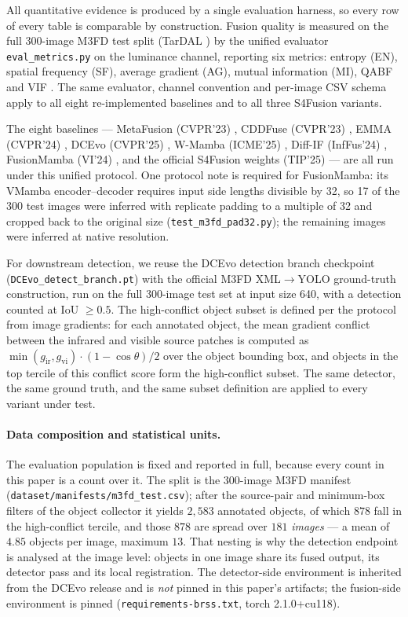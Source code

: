 \documentclass[pdflatex,sn-mathphys-num]{sn-jnl}
\theoremstyle{thmstyleone}%
\theoremstyle{thmstyletwo}%
\theoremstyle{thmstylethree}%
\begin{document}
All quantitative evidence is produced by a single evaluation harness, so every row of every table is comparable by construction. Fusion quality is measured on the full 300-image M3FD test split (TarDAL \cite{liu2022tardal}) by the unified evaluator \texttt{eval\_metrics.py} on the luminance channel, reporting six metrics: entropy (EN), spatial frequency (SF), average gradient (AG), mutual information (MI), QABF \cite{xydeas2000objective} and VIF \cite{sheikh2006image}. The same evaluator, channel convention and per-image CSV schema apply to all eight re-implemented baselines and to all three S4Fusion variants.

The eight baselines --- MetaFusion (CVPR'23) \cite{zhao2023metafusion}, CDDFuse (CVPR'23) \cite{zhao2023cddfuse}, EMMA (CVPR'24) \cite{zhao2024equivariant}, DCEvo (CVPR'25) \cite{liu2025dcevo}, W-Mamba (ICME'25) \cite{zhang2025wmamba}, Diff-IF (InfFus'24) \cite{yi2024diffif}, FusionMamba (VI'24) \cite{xie2024fusionmamba}, and the official S4Fusion weights (TIP'25) \cite{ma2025s4fusion} --- are all run under this unified protocol. One protocol note is required for FusionMamba: its VMamba \cite{liu2024vmamba} encoder--decoder requires input side lengths divisible by 32, so 17 of the 300 test images were inferred with replicate padding to a multiple of 32 and cropped back to the original size (\texttt{test\_m3fd\_pad32.py}); the remaining images were inferred at native resolution.

For downstream detection, we reuse the DCEvo detection branch checkpoint (\texttt{DCEvo\_detect\_branch.pt}) with the official M3FD XML$\to$YOLO ground-truth construction, run on the full 300-image test set at input size 640, with a detection counted at IoU $\geq 0.5$. The high-conflict object subset is defined per the protocol from image gradients: for each annotated object, the mean gradient conflict between the infrared and visible source patches is computed as $\min(g_{\mathrm{ir}}, g_{\mathrm{vi}})\cdot(1-\cos\theta)/2$ over the object bounding box, and objects in the top tercile of this conflict score form the high-conflict subset. The same detector, the same ground truth, and the same subset definition are applied to every variant under test.

\paragraph{Data composition and statistical units.} The evaluation population is fixed and reported in full, because every count in this paper is a count over it. The split is the 300-image M3FD manifest (\texttt{dataset/manifests/m3fd\_test.csv}); after the source-pair and minimum-box filters of the object collector it yields $2{,}583$ annotated objects, of which $878$ fall in the high-conflict tercile, and those $878$ are spread over $181$ \emph{images} --- a mean of $4.85$ objects per image, maximum $13$. That nesting is why the detection endpoint is analysed at the image level: objects in one image share its fused output, its detector pass and its local registration. The detector-side environment is inherited from the DCEvo release and is \emph{not} pinned in this paper's artifacts; the fusion-side environment is pinned (\texttt{requirements-brss.txt}, torch 2.1.0+cu118).
\end{document}
